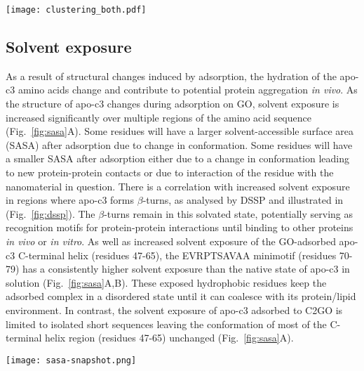 \begin{figure*}
    \centering
    \texttt{[image: clustering\_both.pdf]}
    \caption{Uniform Manifold Approximation and Projection (UMAP) dimensionality reduction of protein backbone denaturing during adsorption on GO (top) and C2GO (bottom) nanosheets. Separate clusters show clear separation of distinct protein backbone secondary structures. Protein structures corresponding to each cluster are coloured by secondary structure (helices in blue, loops in pink) on top of an overlay of all cluster conformations (grey).}
    \label{fig:umap}
\end{figure*}

\subsection{Solvent exposure}
As a result of structural changes induced by adsorption, the hydration of the apo-c3 amino acids change and contribute to potential protein aggregation \textit{in vivo}. As the structure of apo-c3 changes during adsorption on GO, solvent exposure is increased significantly over multiple regions of the amino acid sequence (Fig.~\ref{fig:sasa}A). Some residues will have a larger solvent-accessible surface area (SASA) after adsorption due to change in conformation. Some residues will have a smaller SASA after adsorption either due to a change in conformation leading to new protein-protein contacts or due to interaction of the residue with the nanomaterial in question. There is a correlation with increased solvent exposure in regions where apo-c3 forms $\beta$-turns, as analysed by DSSP and illustrated in (Fig.~\ref{fig:dssp}). The $\beta$-turns remain in this solvated state, potentially serving as recognition motifs for protein-protein interactions until binding to other proteins \textit{in vivo} or \textit{in vitro}.\cite{tyndall2005over} As well as increased solvent exposure of the GO-adsorbed apo-c3 C-terminal helix (residues 47-65), the EVRPTSAVAA minimotif (residues 70-79) has a consistently higher solvent exposure than the native state of apo-c3 in solution (Fig.~\ref{fig:sasa}A,B). These exposed hydrophobic residues keep the adsorbed complex in a disordered state until it can coalesce with its protein/lipid environment. In contrast, the solvent exposure of apo-c3 adsorbed to C2GO is limited to isolated short sequences leaving the conformation of most of the C-terminal helix region (residues 47-65) unchanged (Fig.~\ref{fig:sasa}A).

\begin{figure*}
    \centering
    \texttt{[image: sasa-snapshot.png]}
    \caption{The surface accessible surface area (SASA) of apo-c3 amino acid residues during adsorption to GO and C2GO sheets, normalised by average SASA of apo-c3 in solution (A) and illustration of exposure of the AVAA minimotif in the C-terminal region of apo-c3 to solvent in GO adsorption and contrasting structure in C2GO adsorption, the nanomaterials are represented as a surface for clarity (B).}
    \label{fig:sasa}
\end{figure*}

